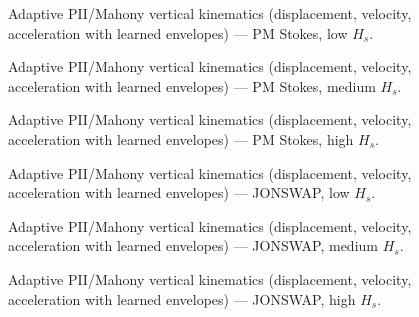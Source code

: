 \documentclass[11pt,letterpaper]{article}
\begin{document}

    \begin{figure}[H]\centering
    \resizebox{\textwidth}{!}{}
    \caption{Adaptive PII/Mahony vertical kinematics (displacement, velocity, acceleration with learned envelopes) --- PM Stokes, low $H_s$.}
    \label{fig:w3d_nonkalman_pmstokes_low_zkin}
    \end{figure}

    \begin{figure}[H]\centering
    \resizebox{\textwidth}{!}{}
    \caption{Adaptive PII/Mahony vertical kinematics (displacement, velocity, acceleration with learned envelopes) --- PM Stokes, medium $H_s$.}
    \label{fig:w3d_nonkalman_pmstokes_medium_zkin}
    \end{figure}

    \begin{figure}[H]\centering
    \resizebox{\textwidth}{!}{}
    \caption{Adaptive PII/Mahony vertical kinematics (displacement, velocity, acceleration with learned envelopes) --- PM Stokes, high $H_s$.}
    \label{fig:w3d_nonkalman_pmstokes_high_zkin}
    \end{figure}

    \begin{figure}[H]\centering
    \resizebox{\textwidth}{!}{}
    \caption{Adaptive PII/Mahony vertical kinematics (displacement, velocity, acceleration with learned envelopes) --- JONSWAP, low $H_s$.}
    \label{fig:w3d_nonkalman_jonswap_low_zkin}
    \end{figure}

    \begin{figure}[H]\centering
    \resizebox{\textwidth}{!}{}
    \caption{Adaptive PII/Mahony vertical kinematics (displacement, velocity, acceleration with learned envelopes) --- JONSWAP, medium $H_s$.}
    \label{fig:w3d_nonkalman_jonswap_medium_zkin}
    \end{figure}

    \begin{figure}[H]\centering
    \resizebox{\textwidth}{!}{}
    \caption{Adaptive PII/Mahony vertical kinematics (displacement, velocity, acceleration with learned envelopes) --- JONSWAP, high $H_s$.}
    \label{fig:w3d_nonkalman_jonswap_high_zkin}
    \end{figure}
\end{document}
